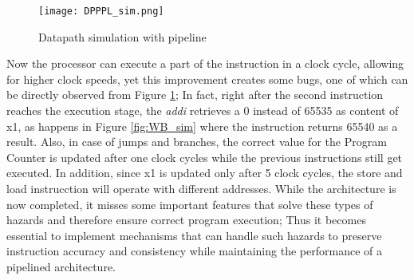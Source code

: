 \begin{figure}[!ht]
    \centering
    \texttt{[image: DPPPL\_sim.png]}
    \caption{Datapath simulation with pipeline}
    \label{fig:DPPPL_sim}
\end{figure}

Now the processor can execute a part of the instruction in a clock cycle, allowing for higher clock speeds, yet this improvement creates some bugs, one of which can be directly observed from Figure \ref{fig:DPPPL_sim}; In fact, right after the second instruction reaches the execution stage, the \emph{addi} retrieves a 0 instead of 65535 as content of x1, as happens in Figure \ref{fig:WB_sim} where the instruction returns 65540 as a result.
Also, in case of jumps and branches, the correct value for the Program Counter is updated after one clock cycles while the previous instructions still get executed. In addition, since x1 is updated only after 5 clock cycles, the store and load instrucction will operate with different addresses.
While the architecture is now completed, it misses some important features that solve these types of hazards and therefore ensure correct program execution; Thus it becomes essential to implement mechanisms that can handle such hazards to preserve instruction accuracy and consistency while maintaining the performance of a pipelined architecture.  